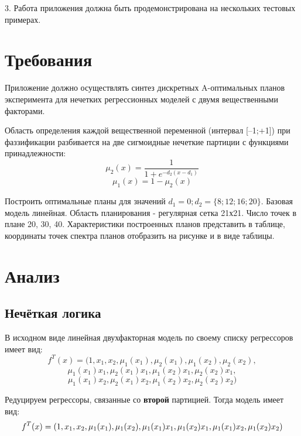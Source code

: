 3. Работа приложения должна быть продемонстрирована на нескольких тестовых примерах.



\section{Требования}

Приложение должно осуществлять синтез дискретных A-оптимальных планов эксперимента
для нечетких регрессионных  моделей  с  двумя  вещественными факторами.

Область  определения  каждой  вещественной  переменной (интервал  [–1;+1])
при фаззификации разбивается на две сигмоидные нечеткие партиции с функциями принадлежности:
\[ \mu_2(x) = \frac{1}{1+e^{-d_2(x-d_1)}} \]
\[ \mu_1(x) = 1 - \mu_2(x) \]



Построить оптимальные планы для  значений $d_1 = 0; d_2 = \{8; 12; 16; 20\}$.
Базовая  модель  линейная.  Область планирования - регулярная  сетка  21х21.
Число  точек  в  плане  20,  30,  40. Характеристики  построенных планов представить
в таблице, координаты  точек спектра планов отобразить на рисунке и в виде таблицы.



\section{Анализ}

\subsection{Нечёткая логика}

В исходном виде линейная двухфакторная модель по своему списку регрессоров имеет вид:
\[ f^T(x) = (1, x_1, x_2, \mu_1(x_1), \mu_2(x_1), \mu_1(x_2), \mu_2(x_2), \]
\[ \mu_1(x_1)x_1, \mu_2(x_1)x_1, \mu_1(x_2)x_1, \mu_2(x_2)x_1, \]
\[ \mu_1(x_1)x_2, \mu_2(x_1)x_2, \mu_1(x_2)x_2, \mu_2(x_2)x_2) \]

Редуцируем регрессоры, связанные со \textbf{второй} партицией. Тогда модель имеет вид:
\[f^T(x) = \left( 1, x_1, x_2, \mu_1(x_1), \mu_1(x_2),
\mu_1(x_1)x_1, \mu_1(x_2)x_1, 
\mu_1(x_1)x_2, \mu_1(x_2)x_2  \right)\]



